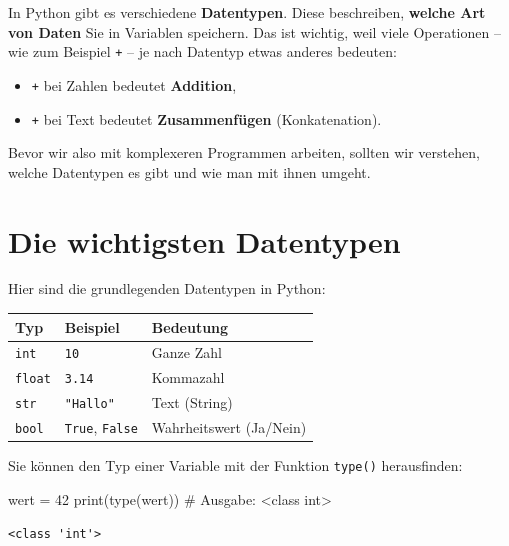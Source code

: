\documentclass[
  letterpaper,
  DIV=11,
  numbers=noendperiod]{scrreprt}
\newenvironment{Shaded}{\begin{snugshade}}{\end{snugshade}}
\newcommand{\BuiltInTok}[1]{\textcolor[rgb]{0.00,0.23,0.31}{#1}}
\newcommand{\CommentTok}[1]{\textcolor[rgb]{0.37,0.37,0.37}{#1}}
\newcommand{\DecValTok}[1]{\textcolor[rgb]{0.68,0.00,0.00}{#1}}
\newcommand{\NormalTok}[1]{\textcolor[rgb]{0.00,0.23,0.31}{#1}}
\newcommand{\OperatorTok}[1]{\textcolor[rgb]{0.37,0.37,0.37}{#1}}
\providecommand{\tightlist}{%
  \setlength{\itemsep}{0pt}\setlength{\parskip}{0pt}}\usepackage{longtable,booktabs,array}
\begin{document}
In Python gibt es verschiedene \textbf{Datentypen}. Diese beschreiben,
\textbf{welche Art von Daten} Sie in Variablen speichern. Das ist
wichtig, weil viele Operationen -- wie zum Beispiel \texttt{+} -- je
nach Datentyp etwas anderes bedeuten:

\begin{itemize}
\tightlist
\item
  \texttt{+} bei Zahlen bedeutet \textbf{Addition},
\item
  \texttt{+} bei Text bedeutet \textbf{Zusammenfügen} (Konkatenation).
\end{itemize}

Bevor wir also mit komplexeren Programmen arbeiten, sollten wir
verstehen, welche Datentypen es gibt und wie man mit ihnen umgeht.

\section{Die wichtigsten Datentypen}\label{die-wichtigsten-datentypen}

Hier sind die grundlegenden Datentypen in Python:

\begin{longtable}[]{@{}lll@{}}
\toprule\noalign{}
Typ & Beispiel & Bedeutung \\
\midrule\noalign{}
\endhead
\bottomrule\noalign{}
\endlastfoot
\texttt{int} & \texttt{10} & Ganze Zahl \\
\texttt{float} & \texttt{3.14} & Kommazahl \\
\texttt{str} & \texttt{"Hallo"} & Text (String) \\
\texttt{bool} & \texttt{True}, \texttt{False} & Wahrheitswert
(Ja/Nein) \\
\end{longtable}

Sie können den Typ einer Variable mit der Funktion \texttt{type()}
herausfinden:

\begin{Shaded}
\begin{Highlighting}[]
\NormalTok{wert }\OperatorTok{=} \DecValTok{42}
\BuiltInTok{print}\NormalTok{(}\BuiltInTok{type}\NormalTok{(wert))  }\CommentTok{\# Ausgabe: \textless{}class \textquotesingle{}int\textquotesingle{}\textgreater{}}
\end{Highlighting}
\end{Shaded}

\begin{verbatim}
<class 'int'>
\end{verbatim}
\end{document}

